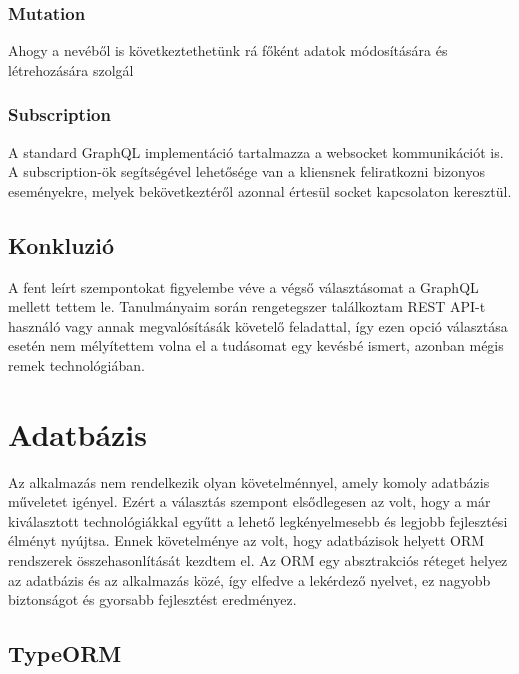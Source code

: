 \subsubsection{Mutation}
Ahogy a nevéből is következtethetünk rá főként adatok módosítására és létrehozására szolgál
  

\subsubsection{Subscription}
A standard GraphQL implementáció tartalmazza a websocket kommunikációt is. A subscription-ök segítségével lehetősége van a kliensnek feliratkozni bizonyos eseményekre, melyek bekövetkeztéről azonnal értesül socket kapcsolaton keresztül.

\subsection{Konkluzió}
A fent leírt szempontokat figyelembe véve a végső választásomat a GraphQL mellett tettem le.
Tanulmányaim során rengetegszer találkoztam REST API-t használó vagy annak megvalósításák követelő feladattal, így ezen opció választása esetén nem mélyítettem volna el a tudásomat egy kevésbé ismert, azonban mégis remek technológiában.

\section{Adatbázis}
Az alkalmazás nem rendelkezik olyan követelménnyel, amely komoly adatbázis műveletet igényel.
Ezért a választás szempont elsődlegesen az volt, hogy a már kiválasztott technológiákkal egyűtt a lehető legkényelmesebb és legjobb fejlesztési élményt nyújtsa. Ennek követelménye az volt, hogy adatbázisok helyett ORM rendszerek összehasonlítását kezdtem el.
Az ORM egy absztrakciós réteget helyez az adatbázis és az alkalmazás közé, így elfedve a lekérdező nyelvet, ez nagyobb biztonságot és gyorsabb fejlesztést eredményez.

\subsection{TypeORM}

